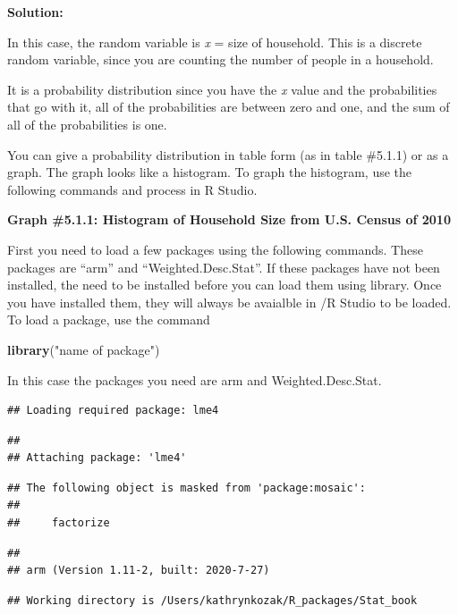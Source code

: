\documentclass[
]{book}
\newenvironment{Shaded}{\begin{snugshade}}{\end{snugshade}}
\newcommand{\KeywordTok}[1]{\textcolor[rgb]{0.13,0.29,0.53}{\textbf{#1}}}
\newcommand{\NormalTok}[1]{#1}
\newcommand{\StringTok}[1]{\textcolor[rgb]{0.31,0.60,0.02}{#1}}
\begin{document}
\textbf{Solution:}

In this case, the random variable is \emph{x} = size of household. This is a discrete random variable, since you are counting the number of people in a household.

It is a probability distribution since you have the \emph{x} value and the probabilities that go with it, all of the probabilities are between zero and one, and the sum of all of the probabilities is one.

You can give a probability distribution in table form (as in table \#5.1.1) or as a graph. The graph looks like a histogram. To graph the histogram, use the following commands and process in R Studio.

\textbf{Graph \#5.1.1: Histogram of Household Size from U.S. Census of 2010}

First you need to load a few packages using the following commands. These packages are ``arm'' and ``Weighted.Desc.Stat''. If these packages have not been installed, the need to be installed before you can load them using library. Once you have installed them, they will always be avaialble in /R Studio to be loaded. To load a package, use the command

\begin{Shaded}
\begin{Highlighting}[]
\KeywordTok{library}\NormalTok{(}\StringTok{"name of package"}\NormalTok{) }
\end{Highlighting}
\end{Shaded}

In this case the packages you need are arm and Weighted.Desc.Stat.

\begin{verbatim}
## Loading required package: lme4
\end{verbatim}

\begin{verbatim}
## 
## Attaching package: 'lme4'
\end{verbatim}

\begin{verbatim}
## The following object is masked from 'package:mosaic':
## 
##     factorize
\end{verbatim}

\begin{verbatim}
## 
## arm (Version 1.11-2, built: 2020-7-27)
\end{verbatim}

\begin{verbatim}
## Working directory is /Users/kathrynkozak/R_packages/Stat_book
\end{verbatim}
\end{document}
